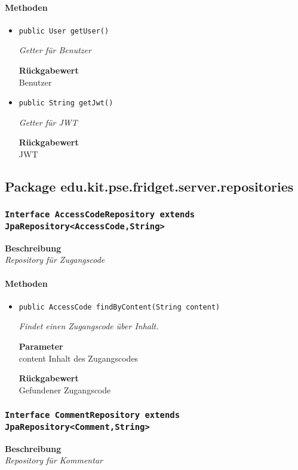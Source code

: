     \paragraph*{Methoden}
    \begin{itemize}
    	\item{\texttt{public User getUser()}}
    	
    	\textit{Getter für Benutzer}
    	
    	
    	
    	\textbf{Rückgabewert} \\
    	Benutzer        \item{\texttt{public String getJwt()}}
    	
    	\textit{Getter für JWT}
    	
    	
    	
    	\textbf{Rückgabewert} \\
    	JWT
    \end{itemize}
    \subsection{Package edu.kit.pse.fridget.server.repositories}
    \subsubsection{\texttt{Interface AccessCodeRepository extends JpaRepository<AccessCode,String>}}
    \textbf{Beschreibung} \\
    \textit{Repository für Zugangscode}
    \paragraph*{Methoden}
    \begin{itemize}
    	\item{\texttt{public AccessCode findByContent(String content)}}
    	
    	\textit{Findet einen Zugangscode über Inhalt.}
    	
    	\textbf{Parameter} \\
    	content Inhalt des Zugangscodes
    	
    	\textbf{Rückgabewert} \\
    	Gefundener Zugangscode
    \end{itemize}
    \subsubsection{\texttt{Interface CommentRepository extends JpaRepository<Comment,String>}}
    \textbf{Beschreibung} \\
    \textit{Repository für Kommentar}

